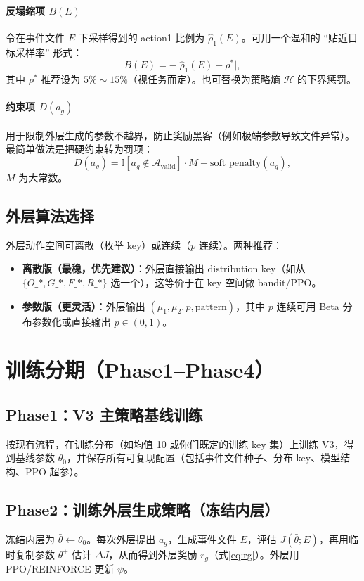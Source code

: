 \documentclass[UTF8,11pt,a4paper]{ctexart}
\begin{document}
\paragraph{反塌缩项 $B(E)$}
令在事件文件 $E$ 下采样得到的 action1 比例为 $\hat\rho_1(E)$。可用一个温和的 ``贴近目标采样率'' 形式：
\begin{equation}
 B(E)=-\big|\hat\rho_1(E)-\rho^*\big|,
\end{equation}
其中 $\rho^*$ 推荐设为 $5\%\sim 15\%$（视任务而定）。也可替换为策略熵 $\mathcal{H}$ 的下界惩罚。

\paragraph{约束项 $D(a_g)$}
用于限制外层生成的参数不越界，防止奖励黑客（例如极端参数导致文件异常）。最简单做法是把硬约束转为罚项：
\begin{equation}
 D(a_g)=\mathbb{I}[a_g\notin\mathcal{A}_{\mathrm{valid}}]\cdot M + \text{soft\_penalty}(a_g),
\end{equation}
$M$ 为大常数。

\subsection{外层算法选择}
外层动作空间可离散（枚举 key）或连续（$p$ 连续）。两种推荐：
\begin{itemize}
\item \textbf{离散版（最稳，优先建议）}：外层直接输出 distribution key（如从 $\{O\_*,G\_*,F\_*,R\_*\}$ 选一个），这等价于在 key 空间做 bandit/PPO。
\item \textbf{参数版（更灵活）}：外层输出 $(\mu_1,\mu_2,p,\text{pattern})$，其中 $p$ 连续可用 Beta 分布参数化或直接输出 $p\in(0,1)$。
\end{itemize}

\section{训练分期（Phase1--Phase4）}

\subsection{Phase1：V3 主策略基线训练}
按现有流程，在训练分布（如均值 10 或你们既定的训练 key 集）上训练 V3，得到基线参数 $\theta_0$，并保存所有可复现配置（包括事件文件种子、分布 key、模型结构、PPO 超参）。

\subsection{Phase2：训练外层生成策略（冻结内层）}
冻结内层为 $\bar\theta\leftarrow\theta_0$。每次外层提出 $a_g$，生成事件文件 $E$，评估 $J(\bar\theta;E)$，再用临时复制参数 $\theta^+$ 估计 $\Delta J$，从而得到外层奖励 $r_g$（式\eqref{eq:rg}）。外层用 PPO/REINFORCE 更新 $\psi$。
\end{document}

